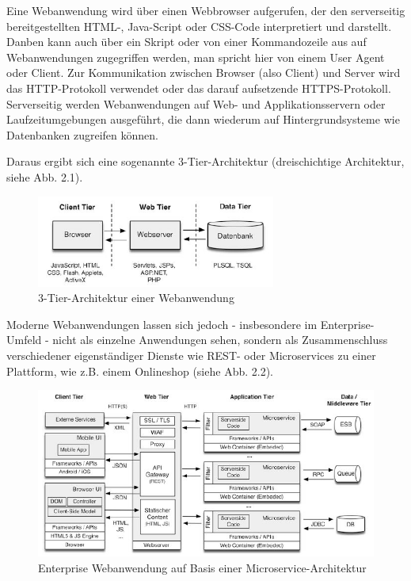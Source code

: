 \documentclass[12pt,oneside,a4paper,parskip]{scrbook}
\begin{document}
  Eine Webanwendung wird über einen Webbrowser aufgerufen, der den serverseitig bereitgestellten HTML-, Java-Script oder CSS-Code interpretiert und darstellt. Danben kann auch über ein Skript oder von einer Kommandozeile aus auf Webanwendungen zugegriffen werden, man spricht hier von einem User Agent oder Client.
  Zur Kommunikation zwischen Browser (also Client) und Server wird das HTTP-Protokoll verwendet oder das darauf aufsetzende HTTPS-Protokoll.
  Serverseitig werden Webanwendungen auf Web- und Applikationsservern oder Laufzeitumgebungen ausgeführt, die dann wiederum auf Hintergrundsysteme wie Datenbanken zugreifen können.

  Daraus ergibt sich eine sogenannte 3-Tier-Architektur (dreischichtige Architektur, siehe Abb. 2.1).
  \begin{figure}[H]
    \centering
     \includegraphics[width=0.7\textwidth]{Images/3_Tier_Architektur}
    \caption[3-Tier-Architektur einer Webanwendung]{3-Tier-Architektur einer Webanwendung \cite{Rohr}}
  \end{figure}

  Moderne Webanwendungen lassen sich jedoch - insbesondere im Enterprise-Umfeld - nicht als einzelne Anwendungen sehen, sondern als Zusammenschluss verschiedener eigenständiger Dienste wie REST- oder Microservices zu einer Plattform, wie z.B. einem Onlineshop (siehe Abb. 2.2).
  \begin{figure}[H]
    \centering
     \includegraphics[width=1\textwidth]{Images/Enterprise}
    \caption[Enterprise Webanwendung auf Basis einer Microservice-Architektur]{Enterprise Webanwendung auf Basis einer Microservice-Architektur \cite{Rohr}}
  \end{figure}
\end{document}
